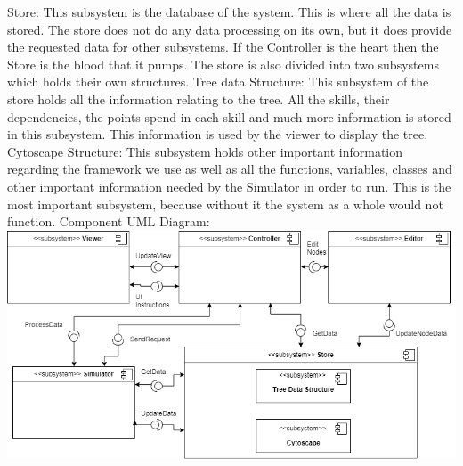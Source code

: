 \documentclass{article}
\begin{document}
  Store:\newline
  This subsystem is the database of the system. This is where all the data is stored. The store does not do any data processing on its own, but it does provide the requested data for other subsystems. If the Controller is the heart then the Store is the blood that it pumps. The store is also divided into two subsystems which holds their own structures.\newline
  Tree data Structure:\newline 
  This subsystem of the store holds all the information relating to the tree. All the skills, their dependencies, the points spend in each skill and much more information is stored in this subsystem. This information is used by the viewer to display the tree.\newline
  Cytoscape Structure:\newline 
  This subsystem holds other important information regarding the framework we use as well as all the functions, variables, classes and other important information needed by the Simulator in order to run. This is the most important subsystem, because without it the system as a whole would not function.\newline \newline 
  Component UML Diagram:
  \includegraphics[width=\textwidth]{TriiUMLComponentDiagram}
\end{document}
